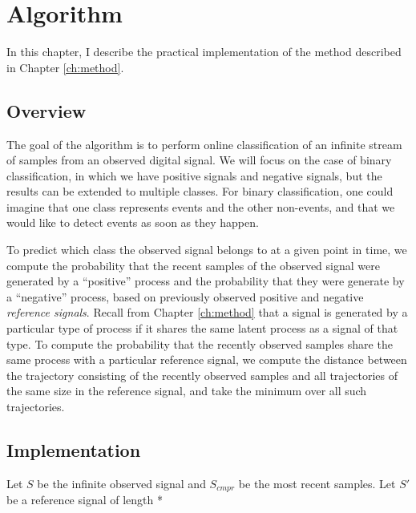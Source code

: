 \chapter{Algorithm}
\label{ch:alg}


In this chapter, I describe the practical implementation of the method described
in Chapter \ref{ch:method}.

\section{Overview}

The goal of the algorithm is to perform online classification of an infinite
stream of samples from an observed digital signal. We will focus on the case of
binary classification, in which we have positive signals and negative signals,
but the results can be extended to multiple classes.  For binary classification,
one could imagine that one class represents events and the other non-events, and
that we would like to detect events as soon as they happen.

To predict which class the observed signal belongs to at a given point in time,
we compute the probability that the recent samples of the observed signal were
generated by a ``positive'' process and the probability that they were generate
by a ``negative'' process, based on previously observed positive and negative
{\em reference signals}. Recall from Chapter \ref{ch:method} that a signal is
generated by a particular type of process if it shares the same latent process
as a signal of that type. To compute the probability that the recently observed
samples share the same process with a particular reference signal, we compute
the distance between the trajectory consisting of the recently observed samples
and all trajectories of the same size in the reference signal, and take the
minimum over all such trajectories.


\section{Implementation}

Let $S$ be the infinite observed signal and $S_{cmpr}$ be the most recent
 samples. Let $S'$ be a reference signal of length
 * {}

